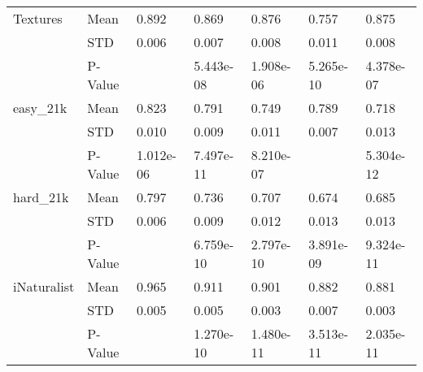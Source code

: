 \begin{table*}[p]
{\begin{tabular}{lll|l|l|l|l}
Textures     & \multicolumn{1}{l|}{Mean}            & 0.892                  & 0.869                  & 0.876                  & 0.757          & 0.875          \\
             & \multicolumn{1}{l|}{STD}             & 0.006                  & 0.007                  & 0.008                  & 0.011          & 0.008          \\
             & \multicolumn{1}{l|}{P-Value}         &                        & 5.443e-08              & 1.908e-06              & 5.265e-10      & 4.378e-07      \\ \hline
easy\_21k    & \multicolumn{1}{l|}{Mean}            & 0.823                  & 0.791                  & 0.749                  & 0.789          & 0.718          \\
             & \multicolumn{1}{l|}{STD}             & 0.010                  & 0.009                  & 0.011                  & 0.007          & 0.013          \\
             & \multicolumn{1}{l|}{P-Value}         & 1.012e-06              & 7.497e-11              & 8.210e-07              &                & 5.304e-12      \\ \hline
hard\_21k    & \multicolumn{1}{l|}{Mean}            & 0.797                  & 0.736                  & 0.707                  & 0.674          & 0.685          \\
             & \multicolumn{1}{l|}{STD}             & 0.006                  & 0.009                  & 0.012                  & 0.013          & 0.013          \\
             & \multicolumn{1}{l|}{P-Value}         &                        & 6.759e-10              & 2.797e-10              & 3.891e-09      & 9.324e-11      \\ \hline
iNaturalist  & \multicolumn{1}{l|}{Mean}            & 0.965                  & 0.911                  & 0.901                  & 0.882          & 0.881          \\
             & \multicolumn{1}{l|}{STD}             & 0.005                  & 0.005                  & 0.003                  & 0.007          & 0.003          \\
             & \multicolumn{1}{l|}{P-Value}         &                        & 1.270e-10              & 1.480e-11              & 3.513e-11      & 2.035e-11
\end{tabular}
}
\end{table*}








